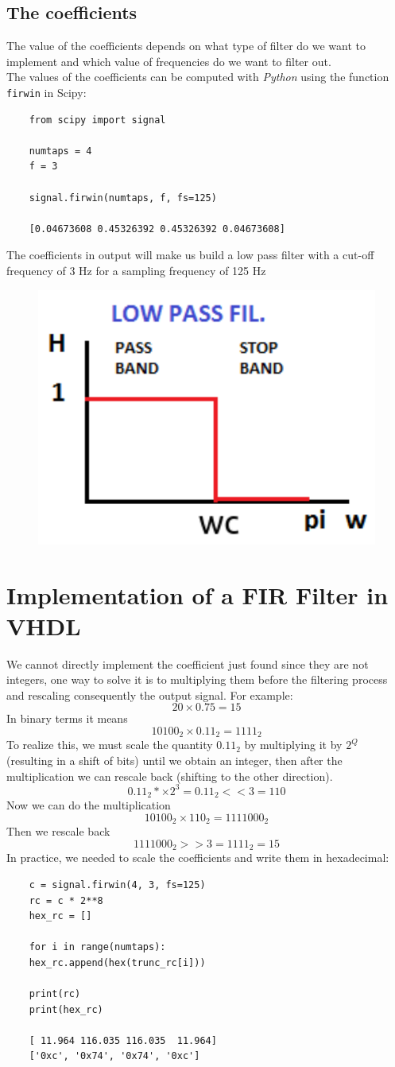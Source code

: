 \documentclass[11pt,a4paper,twocolumn]{IEEEtran}
\begin{document}
	\subsection*{The coefficients}
	The value of the coefficients depends on what type of filter do we want to implement and which value of frequencies do we want to filter out.\\
	The values of the coefficients can be computed with \emph{Python} using the function \texttt{firwin} in Scipy:
	\begin{lstlisting}
	from scipy import signal
	
	numtaps = 4
	f = 3
	
	signal.firwin(numtaps, f, fs=125)
	
	[0.04673608 0.45326392 0.45326392 0.04673608]
	\end{lstlisting}
	The coefficients in output will make us build a low pass filter with a cut-off frequency of 3 Hz for a sampling frequency of 125 Hz
	\begin{figure}[h]
		\centering
		\includegraphics[width=0.7\linewidth]{img/lowpass}
	\end{figure}
	\section{Implementation of a FIR Filter in VHDL}
	We cannot directly implement the coefficient just found since they are not integers, one way to solve it is to multiplying them before the filtering process and rescaling consequently the output signal. For example:\\$$20\times 0.75 = 15$$ In binary terms it means
	$$ 10100_2 \times 0.11_2 = 1111_2$$
	To realize this, we must scale the quantity $0.11_2$ by multiplying it by $2^Q$ (resulting in a shift of bits) until we obtain an integer, then after the multiplication we can rescale back (shifting to the other direction).
	$$0.11_2 *\times 2^3 = 0.11_2 <<3 = 110$$
	Now we can do the multiplication
	$$10100_2\times 110_2 = 1111000_2$$
	Then we rescale back
	$$1111000_2 >> 3 = 1111_2 = 15$$
	In practice, we needed to scale the coefficients and write them in hexadecimal:
	\begin{lstlisting}
	c = signal.firwin(4, 3, fs=125)
	rc = c * 2**8
	hex_rc = []
	
	for i in range(numtaps):
	hex_rc.append(hex(trunc_rc[i]))
	
	print(rc)    
	print(hex_rc)
	
	[ 11.964 116.035 116.035  11.964]
	['0xc', '0x74', '0x74', '0xc']
	\end{lstlisting}
\end{document}
